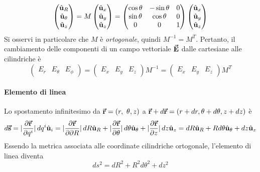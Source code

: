 \begin{equation}
	\begin{pmatrix}
		\hat{\mathbf{u}}_R\\
		\hat{\mathbf{u}}_\theta\\
		\hat{\mathbf{u}}_z
	\end{pmatrix}=M\begin{pmatrix}
		\hat{\mathbf{u}}_x\\
		\hat{\mathbf{u}}_y\\
		\hat{\mathbf{u}}_z
	\end{pmatrix}=
	\begin{pmatrix}
		\cos\theta & -\sin\theta & 0\\
		\sin\theta & \cos\theta & 0\\
		0 & 0 & 1
	\end{pmatrix}
	\begin{pmatrix}
		\hat{\mathbf{u}}_x\\
		\hat{\mathbf{u}}_y\\
		\hat{\mathbf{u}}_z
	\end{pmatrix}
\end{equation}
Si osservi in particolare che $M$ è \textit{ortogonale}, quindi $M^{-1}=M^{T}$.
Pertanto, il cambiamento delle componenti di un campo vettoriale $\vb*{\va{E}}$ dalle cartesiane alle cilindriche è
\begin{equation}
	\begin{pmatrix}
		E_r & E_\theta & E_\phi
	\end{pmatrix}=
	\begin{pmatrix}
		E_x & E_y & E_z
	\end{pmatrix}M^{-1}=
	\begin{pmatrix}
		E_x & E_y & E_z
	\end{pmatrix}M^T
\end{equation}
\paragraph{Elemento di linea}
Lo spostamento infinitesimo da $\vb*{\va{r}}=(r,\ \theta, z)$ a $\vb*{\va{r}}+d\vb*{\va{r}}=(r + dr, \theta + d\theta, z + dz)$ è
\begin{equation}
	d\vb*{\va{s}}=\abs*{\pdv{\vb*{\va{r}}}{q^i}}dq^i\hat{\mathbf{u}}_i=\abs*{\pdv{\vb*{\va{r}}}{\partial R}}dR\hat{\mathbf{u}}_R+\abs*{\pdv{\vb*{\va{r}}}{\theta}}d\theta\hat{\mathbf{u}}_\theta+\abs*{\pdv{\vb*{\va{r}}}{z}}dz\hat{\mathbf{u}}_z=dR\hat{\mathbf{u}}_R+Rd\theta\hat{\mathbf{u}}_\theta+dz\hat{\mathbf{u}}_z\label{spinfinitesimocilindriche}
\end{equation}
Essendo la metrica associata alle coordinate cilindriche ortogonale, l'elemento di linea diventa
\begin{equation}
	ds^2=dR^2+R^2d\theta^2+dz^2
\end{equation}
